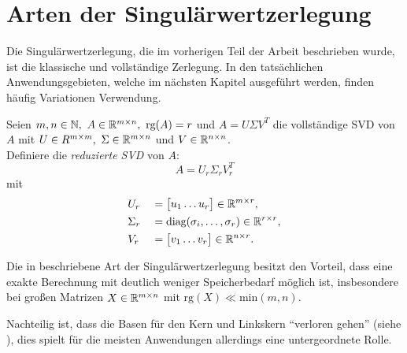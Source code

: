 \section{Arten der Singulärwertzerlegung}

Die Singulärwertzerlegung, die im vorherigen Teil der Arbeit beschrieben wurde, ist die klassische und vollständige Zerlegung.
In den tatsächlichen Anwendungsgebieten, welche im nächsten Kapitel ausgeführt werden, finden häufig Variationen Verwendung.
\begin{definition}\label{df:redsvd}
    Seien \(m,n \in \N,\ A \in \R^{m \times n},\ \text{rg}(A)=r\) und \(A=U \Sigma V^{T}\) die vollständige SVD von \(A\) mit \(U \in R^{m \times m},\ \Sigma \in \mathbb{R}^{m \times n}\) und \(V \in \mathbb{R}^{n \times n}\). \\
    Definiere die \textit{reduzierte SVD} von \(A\):
    \begin{equation*}
        A = U_r \Sigma_r V^{T}_r
    \end{equation*}
    mit
    \begin{alignat*}{2}
        &U_r &{}={}&
        \big[
        \begin{matrix}
            u_1 \dots u_{r}
        \end{matrix}
        \big]
        \in \mathbb{R}^{m \times r}, \\
        &\Sigma_r &{}={}&
        \text{diag}(\sigma_i,\ldots,\sigma_r)
        \in \mathbb{R}^{r \times r}, \\
        &V_r &{}={}&
        \big[
        \begin{matrix}
            v_1 \dots v_{r}
        \end{matrix}
        \big]
        \in \mathbb{R}^{n \times r}.
    \end{alignat*}
\end{definition}
Die in  beschriebene Art der Singulärwertzerlegung besitzt den Vorteil, dass eine exakte Berechnung mit deutlich weniger Speicherbedarf möglich ist, insbesondere bei großen Matrizen \(X \in \mathbb{R}^{m \times n}\) mit \(\text{rg}(X) \ll \text{min}(m,n)\). 

Nachteilig ist, dass die Basen für den Kern und Linkskern \enquote{verloren gehen} (siehe ), dies spielt für die meisten Anwendungen allerdings eine untergeordnete Rolle.

